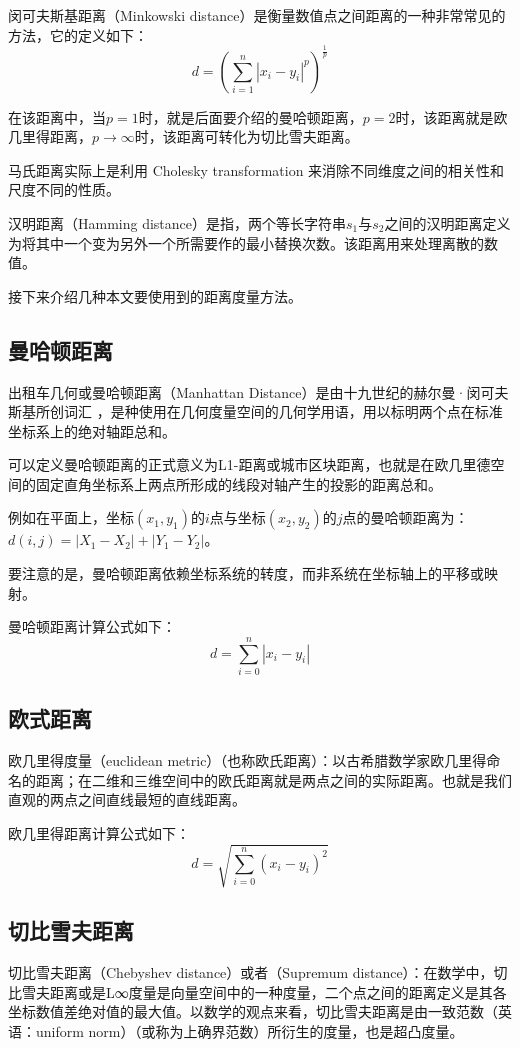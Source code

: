 \documentclass{cugrep}
\begin{document}
闵可夫斯基距离（Minkowski distance）是衡量数值点之间距离的一种非常常见的方法，它的定义如下：
\begin{equation}
	d = \left(\sum_{i = 1}^{n} |x_{i} - y_{i}|^{p}\right)^{\frac 1p}
\end{equation}

在该距离中，当$p=1$时，就是后面要介绍的曼哈顿距离，$p=2$时，该距离就是欧几里得距离，$p\to\infty$时，该距离可转化为切比雪夫距离。

马氏距离实际上是利用 Cholesky transformation 来消除不同维度之间的相关性和尺度不同的性质。

汉明距离（Hamming distance）是指，两个等长字符串$s_{1}$与$s_{2}$之间的汉明距离定义为将其中一个变为另外一个所需要作的最小替换次数。该距离用来处理离散的数值。

接下来介绍几种本文要使用到的距离度量方法。

\subsection{曼哈顿距离}
出租车几何或曼哈顿距离（Manhattan Distance）是由十九世纪的赫尔曼·闵可夫斯基所创词汇 ，是种使用在几何度量空间的几何学用语，用以标明两个点在标准坐标系上的绝对轴距总和。

可以定义曼哈顿距离的正式意义为L1-距离或城市区块距离，也就是在欧几里德空间的固定直角坐标系上两点所形成的线段对轴产生的投影的距离总和。

例如在平面上，坐标$(x_1, y_1)$的$i$点与坐标$(x_2, y_2)$的$j$点的曼哈顿距离为：
$d(i,j)=|X_1-X_2|+|Y_1-Y_2|$。

要注意的是，曼哈顿距离依赖坐标系统的转度，而非系统在坐标轴上的平移或映射。

曼哈顿距离计算公式如下：
\begin{equation}
	d = \sum_{i = 0}^{n} | x_{i} - y_{i}|
\end{equation}
\subsection{欧式距离}
欧几里得度量（euclidean metric）（也称欧氏距离）：以古希腊数学家欧几里得命名的距离；在二维和三维空间中的欧氏距离就是两点之间的实际距离。也就是我们直观的两点之间直线最短的直线距离。

欧几里得距离计算公式如下：
\begin{equation}
	d = \sqrt{\sum_{i = 0}^{n} (x_{i} - y_{i}) ^{2}}
\end{equation}

\subsection{切比雪夫距离}
切比雪夫距离（Chebyshev distance）或者（Supremum distance）：在数学中，切比雪夫距离或是L∞度量是向量空间中的一种度量，二个点之间的距离定义是其各坐标数值差绝对值的最大值。以数学的观点来看，切比雪夫距离是由一致范数（英语：uniform norm）（或称为上确界范数）所衍生的度量，也是超凸度量。
\end{document}
